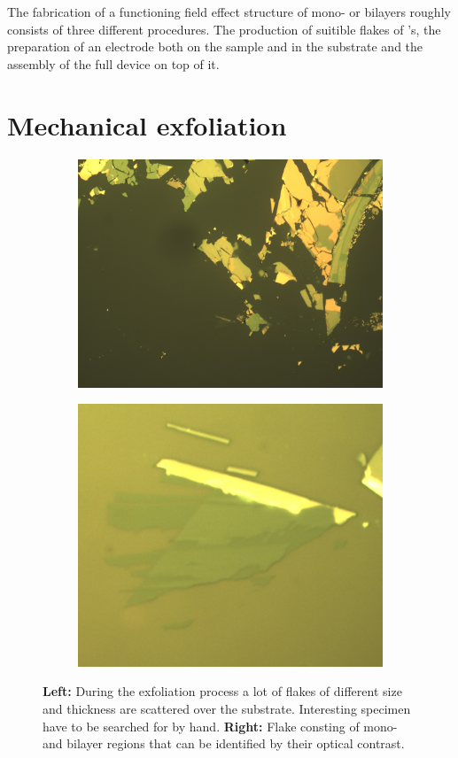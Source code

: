 The fabrication of a functioning field effect structure of \tmdg mono- or bilayers roughly consists of three different procedures. The production of suitible flakes of \tmd's, the preparation of an electrode both on the sample and in the substrate and the assembly of the full device on top of it. 

\section{Mechanical exfoliation}
\begin{figure}
\centering
\begin{subfigure}{0.4\textwidth}
	\includegraphics[width=\textwidth]{flakes.jpg}
\end{subfigure}
\begin{subfigure}{0.349\textwidth}
	\includegraphics[width=\textwidth]{mono_on_sio2.jpg}
\end{subfigure}
\caption{\textbf{Left:} During the exfoliation process a lot of flakes of different size and thickness are scattered over the substrate. Interesting specimen have to be searched for by hand. \textbf{Right:} Flake consting of mono- and bilayer regions that can be identified by their optical contrast.}
	\label{flakes}
\end{figure}
